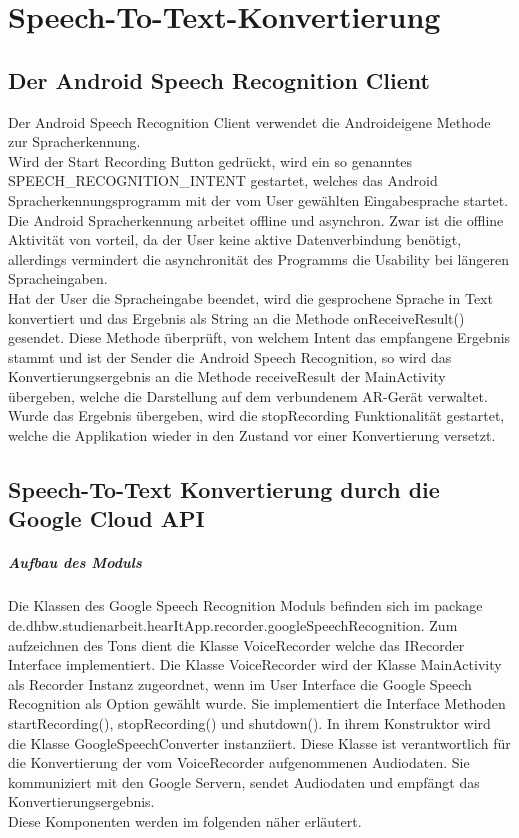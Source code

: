 \chapter{Speech-To-Text-Konvertierung}


\section{Der Android Speech Recognition Client}
Der Android Speech Recognition Client verwendet die Androideigene Methode zur Spracherkennung.\\
Wird der Start Recording Button gedrückt, wird ein so genanntes SPEECH\_RECOGNITION\_INTENT gestartet, welches das Android Spracherkennungsprogramm mit der vom User gewählten Eingabesprache startet.
Die Android Spracherkennung arbeitet offline und asynchron. Zwar ist die offline Aktivität von vorteil, da der User keine aktive Datenverbindung benötigt, allerdings vermindert die asynchronität des Programms die Usability bei längeren Spracheingaben.\\
Hat der User die Spracheingabe beendet, wird die gesprochene Sprache in Text konvertiert und das Ergebnis als String an die Methode onReceiveResult() gesendet. Diese Methode überprüft, von welchem Intent das empfangene Ergebnis stammt und ist der Sender die Android Speech Recognition, so wird das Konvertierungsergebnis an die Methode receiveResult der MainActivity übergeben, welche die Darstellung auf dem verbundenem AR-Gerät verwaltet.\\
Wurde das Ergebnis übergeben, wird die stopRecording Funktionalität gestartet, welche die Applikation wieder in den Zustand vor einer Konvertierung versetzt.


\section{Speech-To-Text Konvertierung durch die Google Cloud API}
\paragraph{Aufbau des Moduls}
Die Klassen des Google Speech Recognition Moduls befinden sich im package de.dhbw.studienarbeit.hearItApp.recorder.googleSpeechRecognition. Zum aufzeichnen des Tons dient die Klasse VoiceRecorder welche das IRecorder Interface implementiert. Die Klasse VoiceRecorder wird der Klasse MainActivity als Recorder Instanz zugeordnet, wenn im User Interface die Google Speech Recognition als Option gewählt wurde. Sie implementiert die Interface Methoden startRecording(), stopRecording() und shutdown(). In ihrem Konstruktor wird die Klasse GoogleSpeechConverter instanziiert. Diese Klasse ist verantwortlich für die Konvertierung der vom VoiceRecorder aufgenommenen Audiodaten. Sie kommuniziert mit den Google Servern, sendet Audiodaten und empfängt das Konvertierungsergebnis.\\
Diese Komponenten werden im folgenden näher erläutert.
\\

